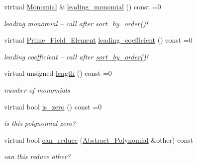 \begin{Indent}
\begin{DoxyCompactItemize}
virtual \hyperlink{group__polygroup_class_monomial}{Monomial} \& \hyperlink{group__polygroup_a9186ed0f55c5cc4ecb1b9bc11ba9f679}{leading\+\_\+monomial} () const =0
\begin{DoxyCompactList}\small\item\em leading monomial -- call after \hyperlink{group__polygroup_a1fcdd29c324c660ea935197c39e682f2}{sort\+\_\+by\+\_\+order()}! \end{DoxyCompactList}\item 
\mbox{\label{group__polygroup_a511ce8e997fe3fd1141293d256e25fad}} 
virtual \hyperlink{group___fields_group_class_prime___field___element}{Prime\+\_\+\+Field\+\_\+\+Element} \hyperlink{group__polygroup_a511ce8e997fe3fd1141293d256e25fad}{leading\+\_\+coefficient} () const =0
\begin{DoxyCompactList}\small\item\em leading coefficient -- call after \hyperlink{group__polygroup_a1fcdd29c324c660ea935197c39e682f2}{sort\+\_\+by\+\_\+order()}! \end{DoxyCompactList}\item 
\mbox{\label{group__polygroup_a48f4c3c030ca66a9386cd71f71d5def7}} 
virtual unsigned \hyperlink{group__polygroup_a48f4c3c030ca66a9386cd71f71d5def7}{length} () const =0
\begin{DoxyCompactList}\small\item\em number of monomials \end{DoxyCompactList}\item 
\mbox{\label{group__polygroup_afb4895702dd56895a792850a831c2f51}} 
virtual bool \hyperlink{group__polygroup_afb4895702dd56895a792850a831c2f51}{is\+\_\+zero} () const =0
\begin{DoxyCompactList}\small\item\em is this polynomial zero? \end{DoxyCompactList}\item 
\mbox{\label{group__polygroup_af43d43a17c02c38c3ba3e71710e226bf}} 
virtual bool \hyperlink{group__polygroup_af43d43a17c02c38c3ba3e71710e226bf}{can\+\_\+reduce} (\hyperlink{group__polygroup_class_abstract___polynomial}{Abstract\+\_\+\+Polynomial} \&other) const
\begin{DoxyCompactList}\small\item\em can {\ttfamily this} reduce {\ttfamily other}? \end{DoxyCompactList}\item 

\end{DoxyCompactItemize}
\end{Indent}
